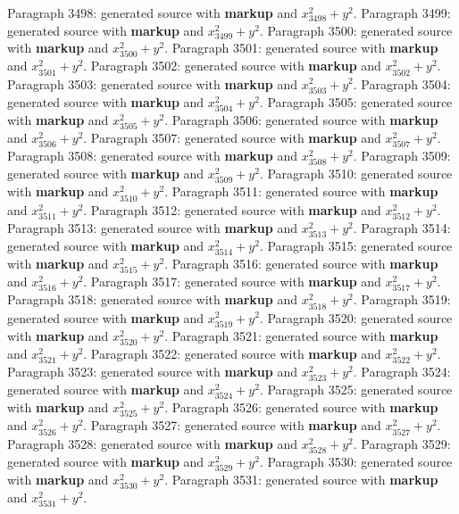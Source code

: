 \documentclass{article}
\begin{document}
Paragraph 3498: generated source with \textbf{markup} and $x_{3498}^2 + y^2$.
Paragraph 3499: generated source with \textbf{markup} and $x_{3499}^2 + y^2$.
Paragraph 3500: generated source with \textbf{markup} and $x_{3500}^2 + y^2$.
Paragraph 3501: generated source with \textbf{markup} and $x_{3501}^2 + y^2$.
Paragraph 3502: generated source with \textbf{markup} and $x_{3502}^2 + y^2$.
Paragraph 3503: generated source with \textbf{markup} and $x_{3503}^2 + y^2$.
Paragraph 3504: generated source with \textbf{markup} and $x_{3504}^2 + y^2$.
Paragraph 3505: generated source with \textbf{markup} and $x_{3505}^2 + y^2$.
Paragraph 3506: generated source with \textbf{markup} and $x_{3506}^2 + y^2$.
Paragraph 3507: generated source with \textbf{markup} and $x_{3507}^2 + y^2$.
Paragraph 3508: generated source with \textbf{markup} and $x_{3508}^2 + y^2$.
Paragraph 3509: generated source with \textbf{markup} and $x_{3509}^2 + y^2$.
Paragraph 3510: generated source with \textbf{markup} and $x_{3510}^2 + y^2$.
Paragraph 3511: generated source with \textbf{markup} and $x_{3511}^2 + y^2$.
Paragraph 3512: generated source with \textbf{markup} and $x_{3512}^2 + y^2$.
Paragraph 3513: generated source with \textbf{markup} and $x_{3513}^2 + y^2$.
Paragraph 3514: generated source with \textbf{markup} and $x_{3514}^2 + y^2$.
Paragraph 3515: generated source with \textbf{markup} and $x_{3515}^2 + y^2$.
Paragraph 3516: generated source with \textbf{markup} and $x_{3516}^2 + y^2$.
Paragraph 3517: generated source with \textbf{markup} and $x_{3517}^2 + y^2$.
Paragraph 3518: generated source with \textbf{markup} and $x_{3518}^2 + y^2$.
Paragraph 3519: generated source with \textbf{markup} and $x_{3519}^2 + y^2$.
Paragraph 3520: generated source with \textbf{markup} and $x_{3520}^2 + y^2$.
Paragraph 3521: generated source with \textbf{markup} and $x_{3521}^2 + y^2$.
Paragraph 3522: generated source with \textbf{markup} and $x_{3522}^2 + y^2$.
Paragraph 3523: generated source with \textbf{markup} and $x_{3523}^2 + y^2$.
Paragraph 3524: generated source with \textbf{markup} and $x_{3524}^2 + y^2$.
Paragraph 3525: generated source with \textbf{markup} and $x_{3525}^2 + y^2$.
Paragraph 3526: generated source with \textbf{markup} and $x_{3526}^2 + y^2$.
Paragraph 3527: generated source with \textbf{markup} and $x_{3527}^2 + y^2$.
Paragraph 3528: generated source with \textbf{markup} and $x_{3528}^2 + y^2$.
Paragraph 3529: generated source with \textbf{markup} and $x_{3529}^2 + y^2$.
Paragraph 3530: generated source with \textbf{markup} and $x_{3530}^2 + y^2$.
Paragraph 3531: generated source with \textbf{markup} and $x_{3531}^2 + y^2$.
\end{document}
